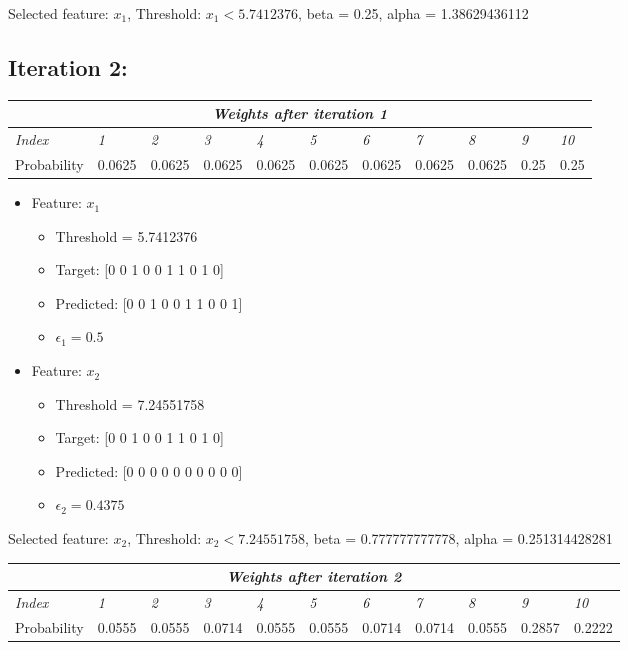 \documentclass[11pt]{article}
\begin{document}
Selected feature: $x_1$, Threshold: $x_1 < 5.7412376$, beta = 0.25, alpha = 1.38629436112

\subsection*{Iteration 2:} 

\begin{table}[H]
\centering
\begin{tabular}{ |p{2cm}||p{1cm}|p{1cm}|p{1cm}|p{1cm}|p{1cm}|p{1cm}|p{1cm}|p{1cm}|p{1cm}|p{1cm}|  }
 \hline
 \multicolumn{11}{|c|}{\textbf{\textit{Weights after iteration 1}}} \\
 \hline
 \textit{Index} & \textit{1} & \textit{2} & \textit{3} & \textit{4} & \textit{5} & \textit{6} & \textit{7} & \textit{8} & \textit{9} & \textit{10} \\
 \hline
 Probability   & 0.0625 & 0.0625 & 0.0625 & 0.0625 & 0.0625 & 0.0625 & 0.0625 & 0.0625 & 0.25 & 0.25  \\
 \hline
\end{tabular}
\end{table}

\begin{itemize}
\item Feature: $x_1$
    \begin{itemize}
    \item Threshold = 5.7412376
    \item Target: [0 0 1 0 0 1 1 0 1 0]
    \item Predicted: [0 0 1 0 0 1 1 0 0 1]
    \item $\epsilon_1 = 0.5$
    \end{itemize}
\item Feature: $x_2$
    \begin{itemize}
    \item Threshold = 7.24551758
    \item Target: [0 0 1 0 0 1 1 0 1 0]
    \item Predicted: [0 0 0 0 0 0 0 0 0 0]
    \item $\epsilon_2 = 0.4375$
    \end{itemize}
\end{itemize}

Selected feature: $x_2$, Threshold: $x_2 < 7.24551758$, beta = 0.777777777778, alpha = 0.251314428281

\begin{table}[H]
\centering
\begin{tabular}{ |p{2cm}||p{1cm}|p{1cm}|p{1cm}|p{1cm}|p{1cm}|p{1cm}|p{1cm}|p{1cm}|p{1cm}|p{1cm}|  }
 \hline
 \multicolumn{11}{|c|}{\textbf{\textit{Weights after iteration 2}}} \\
 \hline
 \textit{Index} & \textit{1} & \textit{2} & \textit{3} & \textit{4} & \textit{5} & \textit{6} & \textit{7} & \textit{8} & \textit{9} & \textit{10} \\
 \hline
 Probability   & 0.0555 & 0.0555 & 0.0714 & 0.0555 & 0.0555 & 0.0714 & 0.0714 & 0.0555 & 0.2857 & 0.2222  \\
 \hline
\end{tabular}
\end{table}
\end{document}
